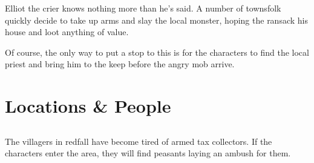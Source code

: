 Elliot the crier knows nothing more than he's said.  A number of townsfolk quickly decide to take up arms and slay the local monster, hoping the ransack his house and loot anything of value.

Of course, the only way to put a stop to this is for the characters to find the local priest and bring him to the keep before the angry mob arrive.

%
%
%
%
%

\section{Locations \& People}

\subsection{}
\vspace{-1cm}

\label{redfall_map}

The villagers in \gls{redfall} have become tired of armed tax collectors.  If the characters enter the area, they will find peasants laying an ambush for them.


\humanfarmer

